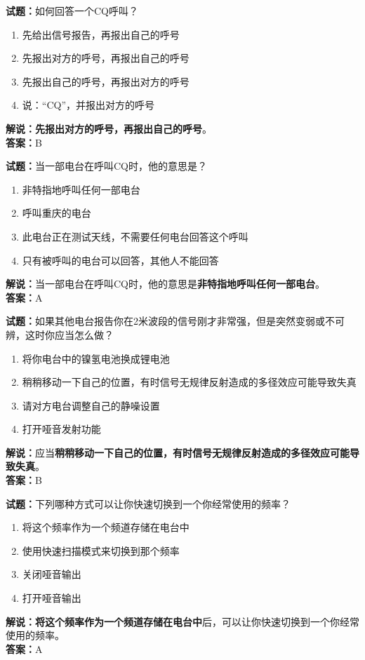\documentclass{ctexbook}
\begin{document}
\bigskip




\noindent\textbf{试题：}如何回答一个CQ呼叫？
\begin{enumerate}[leftmargin=3em]
\item 先给出信号报告，再报出自己的呼号
\item 先报出对方的呼号，再报出自己的呼号
\item 先报出自己的呼号，再报出对方的呼号
\item 说：“CQ”，并报出对方的呼号
\end{enumerate}
\noindent\textbf{解说：}\textbf{先报出对方的呼号，再报出自己的呼号}。\\\noindent\textbf{答案：}B

\bigskip




\noindent\textbf{试题：}当一部电台在呼叫CQ时，他的意思是？
\begin{enumerate}[leftmargin=3em]
\item 非特指地呼叫任何一部电台
\item 呼叫重庆的电台
\item 此电台正在测试天线，不需要任何电台回答这个呼叫
\item 只有被呼叫的电台可以回答，其他人不能回答
\end{enumerate}
\noindent\textbf{解说：}当一部电台在呼叫CQ时，他的意思是\textbf{非特指地呼叫任何一部电台}。\\\noindent\textbf{答案：}A

\bigskip




\noindent\textbf{试题：}如果其他电台报告你在2米波段的信号刚才非常强，但是突然变弱或不可辨，这时你应当怎么做？
\begin{enumerate}[leftmargin=3em]
\item 将你电台中的镍氢电池换成锂电池
\item 稍稍移动一下自己的位置，有时信号无规律反射造成的多径效应可能导致失真
\item 请对方电台调整自己的静噪设置
\item 打开哑音发射功能
\end{enumerate}
\noindent\textbf{解说：}应当\textbf{稍稍移动一下自己的位置，有时信号无规律反射造成的多径效应可能导致失真}。\\\noindent\textbf{答案：}B

\bigskip




\noindent\textbf{试题：}下列哪种方式可以让你快速切换到一个你经常使用的频率？
\begin{enumerate}[leftmargin=3em]
\item 将这个频率作为一个频道存储在电台中
\item 使用快速扫描模式来切换到那个频率
\item 关闭哑音输出
\item 打开哑音输出
\end{enumerate}
\noindent\textbf{解说：}\textbf{将这个频率作为一个频道存储在电台中}后，可以让你快速切换到一个你经常使用的频率。\\\noindent\textbf{答案：}A
\end{document}
